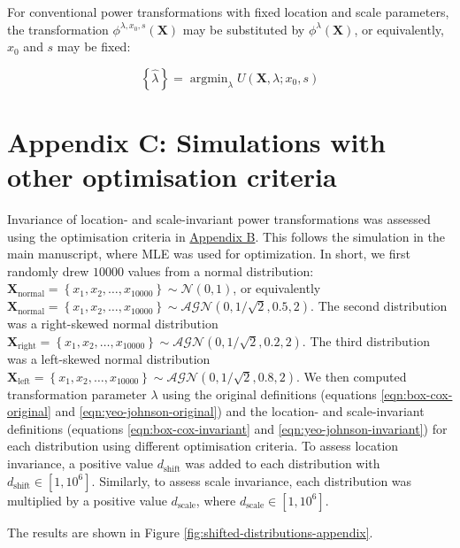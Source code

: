 \documentclass[
  a4paper,
]{article}
\DeclareMathOperator*{\argmin}{argmin}
\begin{document}
For conventional power transformations with fixed location and scale
parameters, the transformation \(\phi^{\lambda, x_0, s} (\mathbf{X})\)
may be substituted by \(\phi^{\lambda} (\mathbf{X})\), or equivalently,
\(x_0\) and \(s\) may be fixed:

\begin{equation}
\left\{ \hat{\lambda}\right\} = \argmin_{\lambda} U\left(\mathbf{X}, \lambda; x_0, s \right)
\end{equation}

\section{Appendix C: Simulations with other optimisation
criteria}\label{appendix-c-simulations-with-other-optimisation-criteria}

Invariance of location- and scale-invariant power transformations was
assessed using the optimisation criteria in
\href{Appendix\%20B:\%20Optimisation\%20of\%20transformation\%20parameters}{Appendix
B}. This follows the simulation in the main manuscript, where MLE was
used for optimization. In short, we first randomly drew \(10000\) values
from a normal distribution:
\(\mathbf{X}_{\text{normal}} = \left\{x_1, x_2, \ldots, x_{10000} \right\} \sim \mathcal{N}\left(0, 1\right)\),
or equivalently
\(\mathbf{X}_{\text{normal}} = \left\{x_1, x_2, \ldots, x_{10000} \right\} \sim \mathcal{AGN}\left(0, 1/\sqrt{2}, 0.5, 2\right)\).
The second distribution was a right-skewed normal distribution
\(\mathbf{X}_{\text{right}} = \left\{x_1, x_2, \ldots, x_{10000} \right\} \sim \mathcal{AGN}\left(0, 1/\sqrt{2}, 0.2, 2\right)\).
The third distribution was a left-skewed normal distribution
\(\mathbf{X}_{\text{left}} = \left\{x_1, x_2, \ldots, x_{10000} \right\} \sim \mathcal{AGN}\left(0, 1/\sqrt{2}, 0.8, 2\right)\).
We then computed transformation parameter \(\lambda\) using the original
definitions (equations \ref{eqn:box-cox-original} and
\ref{eqn:yeo-johnson-original}) and the location- and scale-invariant
definitions (equations \ref{eqn:box-cox-invariant} and
\ref{eqn:yeo-johnson-invariant}) for each distribution using different
optimisation criteria. To assess location invariance, a positive value
\(d_{\text{shift}}\) was added to each distribution with
\(d_{\text{shift}} \in [1, 10^6]\). Similarly, to assess scale
invariance, each distribution was multiplied by a positive value
\(d_{\text{scale}}\), where \(d_{\text{scale}} \in [1, 10^6]\).

The results are shown in Figure
\ref{fig:shifted-distributions-appendix}.
\end{document}

